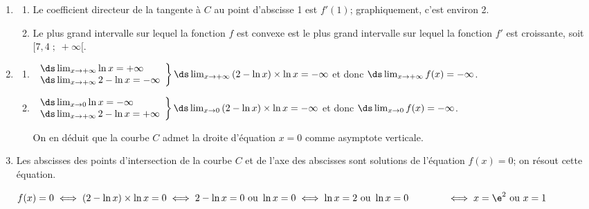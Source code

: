 \begin{enumerate}
	\item%

	\begin{enumerate}
		\item Le coefficient directeur de la tangente à $C$ au point d'abscisse 1 est $f'(1)$; graphiquement, c'est environ 2.

		\item 	Le plus grand intervalle sur lequel la fonction $f$ est convexe est le plus grand intervalle sur lequel la fonction $f'$ est croissante, soit  $[7,4\;;\;+\infty[$.
	\end{enumerate}

	\item \begin{enumerate}
		\item %
$\left .\begin{array}{l}
\ds\lim _{x\to +\infty} \ln x = +\infty\\
\ds\lim _{x\to +\infty} 2-\ln x = -\infty
\end{array}		
\right \}
\ds\lim _{x\to +\infty} \left (2-\ln x\right )\times \ln x = -\infty$
et donc
$\ds\lim _{x\to +\infty} f(x) = -\infty$.

		\item%
$\left .\begin{array}{l}
\ds\lim _{x\to 0} \ln x = -\infty\\
\ds\lim _{x\to +\infty} 2-\ln x = +\infty
\end{array}		
\right \}
\ds\lim _{x\to 0} \left (2-\ln x\right )\times \ln x = -\infty$
et donc
$\ds\lim _{x\to 0} f(x) = -\infty$.
		
On en déduit que la courbe $C$ admet la droite d'équation $x=0$ comme asymptote verticale.		
	\end{enumerate}

	\item %
Les abscisses des points d'intersection de la courbe $C$ et de l'axe des abscisses sont solutions de l'équation $f(x)=0$; on résout cette équation.

$f(x)=0
\iff
(2-\ln x)\times \ln x=0
\iff
2-\ln x = 0 \text{ ou }	\ln x = 0
\iff
\ln x = 2 \text{ ou } \ln x = 0\\
\phantom{f(x)=0}
\iff
x=\e^{2} \text{ ou } x=1$


\end{enumerate}
